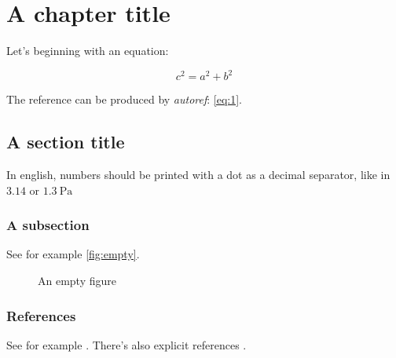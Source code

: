 \documentclass[brazil,english]{brthesis}
\begin{document}
\renewcommand{\nomname}{\listadesimbolosname}
\pdfbookmark[0]{\nomname}{las}
\printnomenclature
\cleardoublepage

\tableofcontents*
\cleardoublepage

\textual

\chapter{A chapter title}
\label{cha:chapter-title}

Let's beginning with an equation:

\begin{equation}
  \label{eq:1}
  c^2 = a^2 + b^2
\end{equation}

The reference can be produced by \textsl{autoref}: \autoref{eq:1}.

\section{A section title}
\label{sec:section-title}

In english, numbers should be printed with a dot as a decimal separator, like in $\num{3.14}$ or $\SI{1.3}{\pascal}$

\subsection{A subsection}
\label{sec:subsection}

See for example \autoref{fig:empty}.

\begin{figure}[!ht]
  \centering
  
  \caption{An empty figure}
  \label{fig:empty}
\end{figure}

\subsection{References}
\label{sec:references}

See for example . There's also explicit references \cite{bib:furlani}.


\postextual


\end{document}
